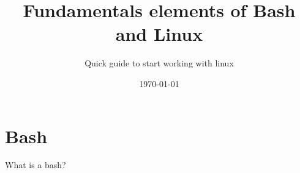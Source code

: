 \documentclass[pdf]{beamer}
\title{Fundamentals elements of Bash and Linux}
\subtitle{Quick guide to start working with linux}
\date{\today}
\begin{document}
\begin{frame}
\titlepage
\end{frame}

\section{Bash}

\begin{frame}{What is a bash?}
\end{frame}
\end{document}
